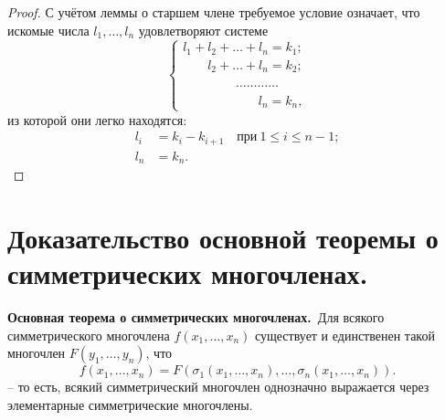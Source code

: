 \documentclass[a4paper, 12pt]{article}
\theoremstyle{definition}
\theoremstyle{remark}
\begin{document}
\begin{proof}
С учётом леммы о старшем члене требуемое условие означает, что
искомые числа $l_1, \ldots, l_n$ удовлетворяют системе
$$
\begin{cases}
l_1 + l_2 + \ldots + l_n = k_1; \\
\phantom{l_1 + {}} l_2 + \ldots + l_n = k_2;\\
\phantom{l_1 + l_2 + .} \ldots\ldots\ldots\ldots\\
\phantom{l_1 + l_s + \ldots + {}} l_n = k_n,
\end{cases}
$$
из которой они легко находятся:
\begin{align*}
l_i &= k_i - k_{i+1} \quad \text{при} \ 1 \leqslant i \leqslant n-1; \\
l_n &= k_n.
\end{align*}
\end{proof}

\section{Доказательство основной теоремы о симметрических многочленах.}

{\bf Основная теорема о симметрических многочленах.}\ Для всякого
симметрического многочлена $f(x_1, \ldots, x_n)$ существует и
единственен такой многочлен $F(y_1, \ldots, y_n)$, что
$$
f(x_1, \ldots, x_n) = F(\sigma_1(x_1, \ldots, x_n), \ldots,
\sigma_n(x_1, \ldots, x_n)).
$$ -- то есть, всякий симметрический
многочлен однозначно выражается через элементарные симметрические
многочлены.
\end{document}
